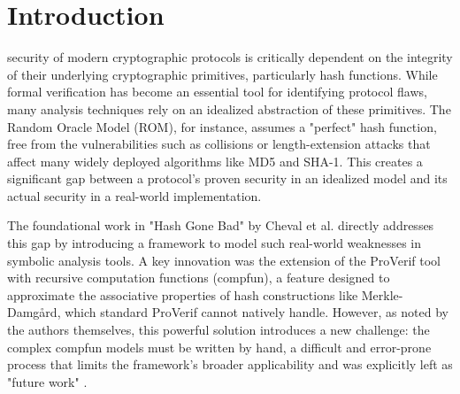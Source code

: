 \documentclass[journal]{IEEEtran}
\begin{document}
%
\IEEEpeerreviewmaketitle



\section{Introduction}
% 
% 
% 
% 
 security of modern cryptographic protocols is critically dependent on the integrity of their underlying cryptographic primitives, particularly hash functions. While formal verification has become an essential tool for identifying protocol flaws, many analysis techniques rely on an idealized abstraction of these primitives. The Random Oracle Model (ROM), for instance, assumes a "perfect" hash function, free from the vulnerabilities such as collisions or length-extension attacks that affect many widely deployed algorithms like MD5 and SHA-1. This creates a significant gap between a protocol's proven security in an idealized model and its actual security in a real-world implementation.

The foundational work in "Hash Gone Bad" by Cheval et al. \cite{cheval2023hash} directly addresses this gap by introducing a framework to model such real-world weaknesses in symbolic analysis tools. A key innovation was the extension of the ProVerif tool with recursive computation functions (compfun), a feature designed to approximate the associative properties of hash constructions like Merkle-Damgård, which standard ProVerif cannot natively handle. However, as noted by the authors themselves, this powerful solution introduces a new challenge: the complex compfun models must be written by hand, a difficult and error-prone process that limits the framework's broader applicability and was explicitly left as "future work" \cite{cheval2023hash}.
\end{document}

